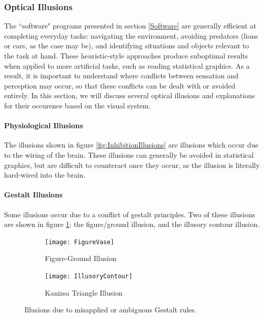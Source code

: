 \documentclass[11pt]{isuthesis}\usepackage[]{graphicx}\usepackage[]{color}
\begin{document}
\subsubsection{Optical Illusions}
The ``software" programs presented in section \ref{Software} are generally efficient at completing everyday tasks: navigating the environment, avoiding predators (lions or cars, as the case may be), and identifying situations and objects relevant to the task at hand. These heuristic-style approaches produce suboptimal results when applied to more artificial tasks, such as reading statistical graphics. As a result, it is important to understand where conflicts between sensation and perception may occur, so that these conflicts can be dealt with or avoided entirely. In this section, we will discuss several optical illusions and explanations for their occurence based on the visual system.

\paragraph{Physiological Illusions} The illusions shown in figure \ref{fig:InhibitionIllusions} are illusions which occur due to the wiring of the brain. These illusions can generally be avoided in statistical graphics, but are difficult to counteract once they occur, as the illusion is literally hard-wired into the brain. 

\paragraph{Gestalt Illusions} Some illusions occur due to a conflict of gestalt principles. Two of these illusions are shown in figure \ref{fig:GestaltIllusions}: the figure/ground illusion, and the illusory contour illusion. 

\begin{figure}[htbp]\centering
\hfil
\begin{subfigure}[b]{.4\linewidth}\centering\vspace{.5cm}
  \texttt{[image: FigureVase]}\vspace{1cm}
  \caption{Figure-Ground Illusion}
\end{subfigure}\hfill
\begin{subfigure}[b]{.4\linewidth}\centering
  \texttt{[image: IllusoryContour]}
  \caption{Kanizsa Triangle Illusion}
\end{subfigure}\hfil
\caption[Gestalt Illusions]{Illusions due to misapplied or ambiguous Gestalt rules.}\label{fig:GestaltIllusions}
\end{figure}
\end{document}
